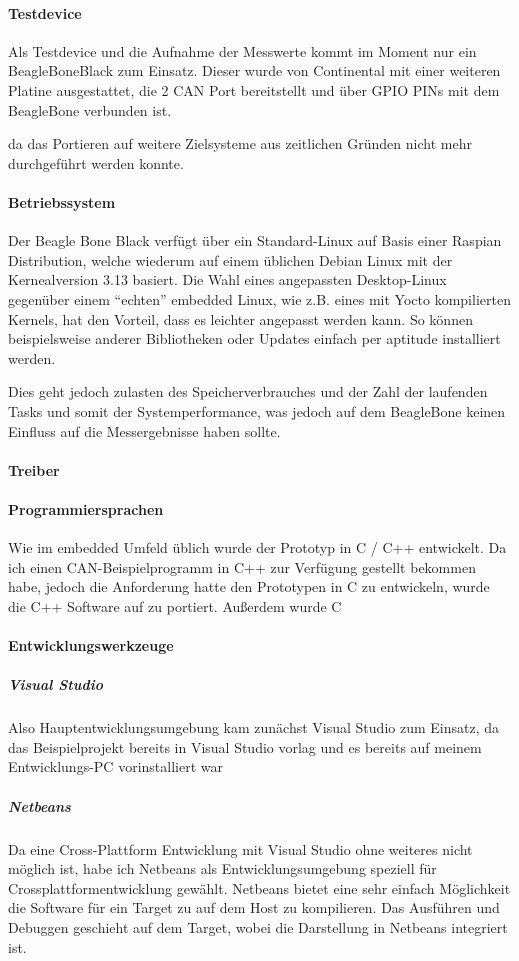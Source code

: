 \paragraph{Testdevice}
Als Testdevice und die Aufnahme der Messwerte kommt im Moment nur ein BeagleBoneBlack zum Einsatz. Dieser wurde von Continental mit einer weiteren Platine ausgestattet, die 2 CAN Port bereitstellt und über GPIO PINs mit dem BeagleBone verbunden ist. 

 da das Portieren auf weitere Zielsysteme aus zeitlichen Gründen nicht mehr durchgeführt werden konnte. 
\paragraph{Betriebssystem}

Der Beagle Bone Black verfügt über ein Standard-Linux auf Basis einer Raspian Distribution, welche wiederum auf einem üblichen Debian Linux mit der Kernealversion 3.13 basiert. Die Wahl eines angepassten Desktop-Linux gegenüber einem "`echten"' embedded Linux, wie z.B. eines mit Yocto kompilierten Kernels, hat den Vorteil, dass es leichter angepasst werden kann. So können beispielsweise anderer Bibliotheken oder Updates einfach per aptitude installiert werden. 

Dies geht jedoch zulasten des Speicherverbrauches und der Zahl der laufenden Tasks und somit der Systemperformance, was jedoch auf dem BeagleBone keinen Einfluss auf die Messergebnisse haben sollte. 

\paragraph{Treiber}
\paragraph{Programmiersprachen}
Wie im embedded Umfeld üblich wurde der Prototyp in C / C++ entwickelt. Da ich einen CAN-Beispielprogramm in C++ zur Verfügung gestellt bekommen habe, jedoch die Anforderung hatte den Prototypen in C zu entwickeln, wurde die C++ Software auf zu portiert. 
Außerdem wurde C
\paragraph{Entwicklungswerkzeuge}
\subparagraph{Visual Studio}
Also Hauptentwicklungsumgebung kam zunächst Visual Studio zum Einsatz, da das Beispielprojekt bereits in Visual Studio vorlag und es bereits auf meinem Entwicklungs-PC vorinstalliert war
\subparagraph{Netbeans}
Da eine Cross-Plattform Entwicklung mit Visual Studio ohne weiteres nicht möglich ist, habe ich Netbeans als Entwicklungsumgebung speziell für Crossplattformentwicklung gewählt. Netbeans bietet eine sehr einfach Möglichkeit die Software für ein Target zu auf dem Host zu kompilieren. Das Ausführen und Debuggen geschieht auf dem Target, wobei die Darstellung in Netbeans integriert ist. %

